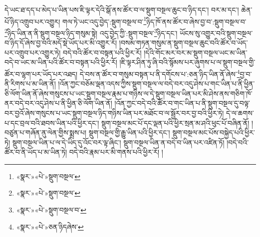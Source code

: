 དེ་ཡང་ཐ་དད་པ་མེད་པ་ཡིན་པས་ཇི་ལྟར་དེའི་སྒོ་ནས་ཚོར་བ་ལ་སྡུག་བསྔལ་ཆུང་བ་ཉིད་དང་། བར་མ་དང་། ཆེན་པོ་ཉིད་འགྲུབ་པར་འགྱུར། གལ་ཏེ་ཡང་འདུ་བྱེད་:སྡུག་བསྔལ་བ་\footnote{«སྣར་»«པེ་»སྡུག་བསྔལ་}ཉིད་ཁོ་ནས་ཚོར་བ་ཞེས་བྱ་བ་:སྡུག་བསྔལ་བ་\footnote{«སྣར་»«པེ་»སྡུག་བསྔལ་}ཉིད་ཡིན་ན་ནི་སྡུག་བསྔལ་ཉིད་གསུམ་སྟེ། འདུ་བྱེད་ཀྱི་:སྡུག་བསྔལ་\footnote{«སྣར་»«པེ་»སྡུག་བསྔལ་བ་}ཉིད་དང་། ཡོངས་སུ་འགྱུར་བའི་སྡུག་བསྔལ་བ་ཉིད་དོ་ཞེས་བྱ་བའི་མདོ་སྡེ་ཡོད་པར་མི་འགྱུར་རོ། །བསམ་གཏན་གསུམ་ན་སྡུག་བསྔལ་ཆུང་བའི་ཚོར་བ་ཡོད་པར་འགྲུབ་པར་འགྱུར་ཏེ། བདེ་བའི་ཚོར་བ་བསྟན་པའི་ཕྱིར་རོ། །དེའི་གོང་མར་བར་མ་སྡུག་བསྔལ་ཡང་མ་ཡིན་བདེ་བ་ཡང་མ་ཡིན་པའི་ཚོར་བ་བསྟན་པའི་ཕྱིར་རོ། །ཇི་ལྟར་ཤིན་ཏུ་ཞི་བའི་སྙོམས་པར་ཞུགས་པ་ལ་སྡུག་བསྔལ་གྱི་ཚོར་བ་ལྷག་པར་ཡོད་པར་འཐད། དེ་བས་ན་ཚོར་བ་གསུམ་བསྟན་པ་ནི་དགོངས་པ་:ཅན་ཉིད་ཡིན་ནོ་ཞེས་\footnote{«སྣར་»«པེ་»ཅན་ཉིདཞེས་}བྱ་བ་ནི་རིགས་པ་མ་ཡིན་ནོ། །འོན་ཀྱང་བཅོམ་ལྡན་འདས་ཀྱིས་སྡུག་བསྔལ་ལ་བདེ་བར་འདུ་ཤེས་པ་གང་ཡིན་པ་ནི་ཕྱིན་ཅི་ལོག་ཡིན་ནོ་ཞེས་གསུངས་པ་ཡང་སྡུག་བསྔལ་རྣམ་པ་གཉིས་ལ་དེ་སྡུག་བསྔལ་ཡིན་པར་མི་ཤེས་ནས་གཅིག་ཁོ་ནར་བདེ་བར་འདུ་ཤེས་པ་ནི་ཕྱིན་ཅི་ལོག་ཡིན་ནོ། །འོན་ཀྱང་བདེ་བའི་ཚོར་བ་གང་ཡིན་པ་ནི་སྡུག་བསྔལ་དུ་བལྟ་བར་བྱའོ་ཞེས་གསུངས་པ་ཡང་སྡུག་བསྔལ་ཉིད་གཉིས་ཡིན་པར་མཐོང་བ་ལ་སྦྱོར་བར་བྱ་བའི་ཕྱིར་ཏེ། དེ་ལ་ཆགས་པ་དང་བྲལ་བའི་ཐབས་ཡིན་པའི་ཕྱིར་དང་། སྡུག་བསྔལ་མང་པོ་དང་ལྡན་པའི་ཕྱིར་སྲན་མ་ཤའི་ཕུང་པོ་བཞིན་ནོ། །བཙུན་པ་གཞོན་ནུ་ལེན་གྱིས་སྨྲས་པ། སྡུག་བསྔལ་གྱི་རྒྱུ་ཡིན་པའི་ཕྱིར་དང་། སྡུག་བསྔལ་མང་པོས་བསྐྱེད་པའི་ཕྱིར་ཏེ། སྡུག་བསྔལ་ཡིན་པ་ལ་དེ་ཡིད་དུ་འོང་བར་ལྟ་ཞིང་། སྡུག་བསྔལ་ཡིན་ན་བདེ་བ་ཡིན་པར་འཛིན་ཏོ། །བདེ་བའི་ཚོར་བ་ནི་ཡོད་པ་མ་ཡིན་ཏེ། བདེ་བའི་རྣམ་པར་མི་གནས་པའི་ཕྱིར་རོ། །
